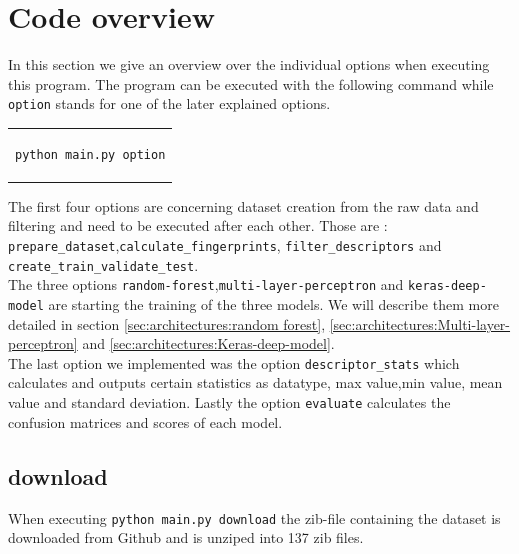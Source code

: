 \documentclass[12pt]{article}
\begin{document}
\section{Code overview}\label{sec:code}
In this section we give an overview over the individual options when executing this program. The program can be executed with the following command while \texttt{option} stands for one of the later explained options.
%
\begin{center}
\begin{tabular}{c}
\begin{lstlisting}[language=bash]
python main.py option
\end{lstlisting}
\end{tabular}
\end{center}
%
The first four options are concerning dataset creation from the raw data and filtering and need to be executed after each other. Those are : \texttt{prepare\_dataset},\texttt{calculate\_fingerprints}, \texttt{filter\_descriptors} and \texttt{create\_train\_validate\_test}.\\
The three options \texttt{random-forest},\texttt{multi-layer-perceptron} and \texttt{keras-deep-model} are starting the training of the three models. We will describe them more detailed in section \ref{sec:architectures:random forest}, \ref{sec:architectures:Multi-layer-perceptron} and \ref{sec:architectures:Keras-deep-model}.\\
The last option we implemented was the option \texttt{descriptor\_stats} which calculates and outputs certain statistics as datatype, max value,min value, mean value and standard deviation. Lastly the option \texttt{evaluate} calculates the confusion matrices and scores of each model.

\subsection{download}
When executing \texttt{python main.py download} the zib-file containing the dataset is downloaded from Github and is unziped into 137 zib files. 
\end{document}
